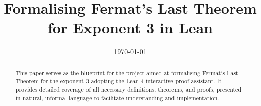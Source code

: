 \documentclass[11pt,a4paper]{report}
\title{Formalising Fermat's Last Theorem for Exponent 3 in Lean}
\date{\today}
\begin{document}
\maketitle
\begin{abstract}
    This paper serves as the blueprint for the project aimed at formalising Fermat’s Last Theorem for
    the exponent 3 adopting the Lean 4 interactive proof assistant. It provides detailed coverage of
    all necessary definitions, theorems, and proofs, presented in natural, informal language to facilitate
    understanding and implementation.
\end{abstract}
\tableofcontents



\nocite{*}
\printbibliography[title=References]
\end{document}
